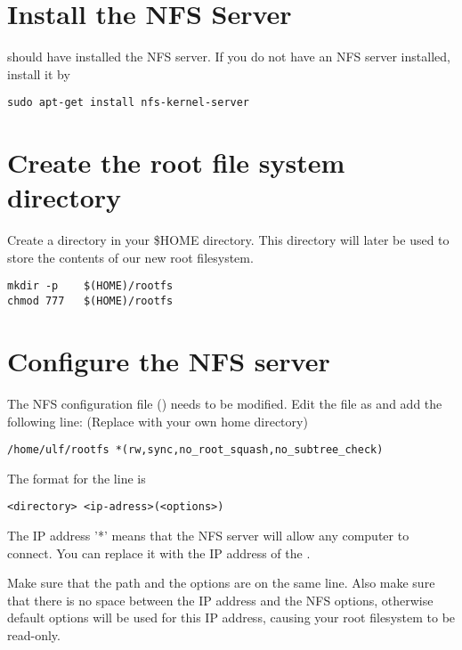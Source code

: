 
\section{Install the NFS Server}

 should have installed the NFS server.
If you do not have an NFS server installed, install it by

\begin{verbatim}
sudo apt-get install nfs-kernel-server
\end{verbatim}

\section{Create the root file system directory}

Create a  directory in your \$HOME directory. This
directory will later be used to store the contents of our new
root filesystem.

\begin{verbatim}
mkdir -p	$(HOME)/rootfs
chmod 777	$(HOME)/rootfs
\end{verbatim}

\section{Configure the NFS server}

The NFS configuration file () needs to be modified.
Edit the file as  and add the following line: (Replace  with your own home directory)

\begin{verbatim}
/home/ulf/rootfs *(rw,sync,no_root_squash,no_subtree_check)
\end{verbatim}

The format for the line is 
\begin{verbatim}
<directory> <ip-adress>(<options>)
\end{verbatim}

The IP address '*' means that the NFS server will allow any computer to connect.
You can replace it with the IP address of the \devboard.

Make sure that the path and the options are on the same line.
Also make sure that there is no space between the IP address and the NFS
options, otherwise default options will be used for this IP address,
causing your root filesystem to be read-only.

